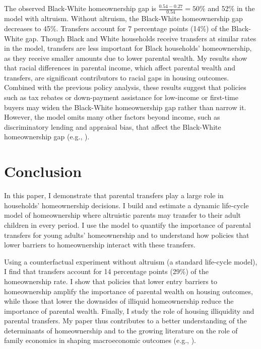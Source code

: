 \documentclass[12pt]{article}
\begin{document}
The observed Black-White homeownership gap is $\frac{0.54 - 0.27}{0.54}=50\%$ and 52\% in the model with altruism. Without altruism, the Black-White homeownership gap decreases to 45\%. Transfers account for 7 percentage points (14\%) of the Black-White gap. Though Black and White households receive transfers at similar rates in the model, transfers are less important for Black households' homeownership, as they receive smaller amounts due to lower parental wealth. My results show that racial differences in parental income, which affect parental wealth and transfers, are significant contributors to racial gaps in housing outcomes. Combined with the previous policy analysis, these results suggest that policies such as tax rebates or down-payment assistance for low-income or first-time buyers may widen the Black-White homeownership gap rather than narrow it. However, the model omits many other factors beyond income, such as discriminatory lending and appraisal bias, that affect the Black-White homeownership gap (e.g., \cite{shapiro2004hidden}).

\section{Conclusion}
In this paper, I demonstrate that parental transfers play a large role in households' homeownership decisions. I build and estimate a dynamic life-cycle model of homeownership where altruistic parents may transfer to their adult children in every period. I use the model to quantify the importance of parental transfers for young adults' homeownership and to understand how policies that lower barriers to homeownership interact with these transfers.

Using a counterfactual experiment without altruism (a standard life-cycle model), I find that transfers account for 14 percentage points (29\%) of the homeownership rate. I show that policies that lower entry barriers to homeownership amplify the importance of parental wealth on housing outcomes, while those that lower the downsides of illiquid homeownership reduce the importance of parental wealth. Finally, I study the role of housing illiquidity and parental transfers. My paper thus contributes to a better understanding of the determinants of homeownership and to the growing literature on the role of family economics in shaping macroeconomic outcomes (e.g., \cite{Doepke2016a,Daruich2018}).
\end{document}
